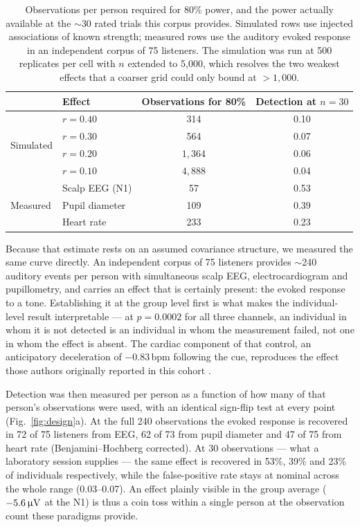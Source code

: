 \begin{table}[htbp]
\centering
\small
\caption{Observations per person required for 80\% power, and the power actually
available at the $\sim$30 rated trials this corpus provides. Simulated rows use
injected associations of known strength; measured rows use the auditory evoked
response in an independent corpus of 75 listeners. The simulation was run at
500 replicates per cell with $n$ extended to 5{,}000, which resolves the two
weakest effects that a coarser grid could only bound at $> 1{,}000$.}
\label{tab:power}
\begin{tabular}{llcc}
\toprule
& Effect & Observations for 80\% & Detection at $n = 30$ \\
\midrule
\multirow{4}{*}{Simulated}
 & $r = 0.40$  & 314         & 0.10 \\
 & $r = 0.30$  & 564         & 0.07 \\
 & $r = 0.20$  & $1{,}364$   & 0.06 \\
 & $r = 0.10$  & $4{,}888$   & 0.04 \\
\midrule
\multirow{3}{*}{Measured}
 & Scalp EEG (N1)  & 57  & 0.53 \\
 & Pupil diameter  & 109 & 0.39 \\
 & Heart rate      & 233 & 0.23 \\
\bottomrule
\end{tabular}
\end{table}

Because that estimate rests on an assumed covariance structure, we measured the
same curve directly. An independent corpus of 75 listeners
\citep{ds003690,ribeiro2019erp,ribeiro2019cardiac} provides $\sim$240 auditory
events per person with
simultaneous scalp EEG, electrocardiogram and pupillometry, and carries an effect
that is certainly present: the evoked response to a tone. Establishing it at the
group level first is what makes the individual-level result interpretable --- at
$p = 0.0002$ for all three channels, an individual in whom it is not detected is
an individual in whom the measurement failed, not one in whom the effect is
absent. The cardiac component of that control, an anticipatory deceleration of
$-0.83$\,bpm following the cue, reproduces the effect those authors originally
reported in this cohort \citep{ribeiro2019cardiac}.

Detection was then measured per person as a function of how many of that person's
observations were used, with an identical sign-flip test at every point
(Fig.~\ref{fig:design}a). At the full 240 observations the evoked response is
recovered in 72 of 75 listeners from EEG, 62 of 73 from pupil diameter and 47 of
75 from heart rate (Benjamini--Hochberg corrected). At 30 observations --- what a
laboratory session supplies --- the same effect is recovered in 53\%, 39\% and
23\% of individuals respectively, while the false-positive rate stays at nominal
across the whole range (0.03--0.07). An effect plainly visible in the group
average ($-5.6\,\upmu\mathrm{V}$ at the N1) is thus a coin toss within a single person at the
observation count these paradigms provide.

